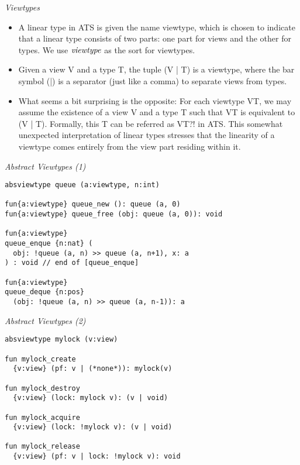 \documentclass[pdf]{prosper}
\begin{document}
\def\VT{{\it VT}}
\def\sviewtype{{\it viewtype}}
\begin{slide}{\em Viewtypes}
\begin{itemize}
\item
A linear type in ATS is given the name viewtype, which is chosen to
indicate that a linear type consists of two parts: one part for views and
the other for types. We use $\sviewtype$ as the sort for viewtypes.
\item Given a view V and a type T, the
tuple (V | T) is a viewtype, where the bar symbol (|) is a separator (just
like a comma) to separate views from types.
\item
What seems a bit surprising is the opposite: For each viewtype VT, we may
assume the existence of a view V and a type T such that VT is equivalent to
(V | T). Formally, this T can be referred as VT?! in ATS. This somewhat
unexpected interpretation of linear types stresses that the linearity of a
viewtype comes entirely from the view part residing within it.
\end{itemize}
\vfill
\end{slide}
\begin{slide}{\em Abstract Viewtypes (1)}
{\blue\begin{verbatim}
absviewtype queue (a:viewtype, n:int)

fun{a:viewtype} queue_new (): queue (a, 0)
fun{a:viewtype} queue_free (obj: queue (a, 0)): void

fun{a:viewtype}
queue_enque {n:nat} (
  obj: !queue (a, n) >> queue (a, n+1), x: a
) : void // end of [queue_enque]

fun{a:viewtype}
queue_deque {n:pos}
  (obj: !queue (a, n) >> queue (a, n-1)): a
\end{verbatim}
}
\end{slide}
\begin{slide}{\em Abstract Viewtypes (2)}
{\blue\begin{verbatim}
absviewtype mylock (v:view)

fun mylock_create
  {v:view} (pf: v | (*none*)): mylock(v)

fun mylock_destroy
  {v:view} (lock: mylock v): (v | void)

fun mylock_acquire
  {v:view} (lock: !mylock v): (v | void)

fun mylock_release
  {v:view} (pf: v | lock: !mylock v): void
\end{verbatim}
}
\end{slide}
\end{document}
